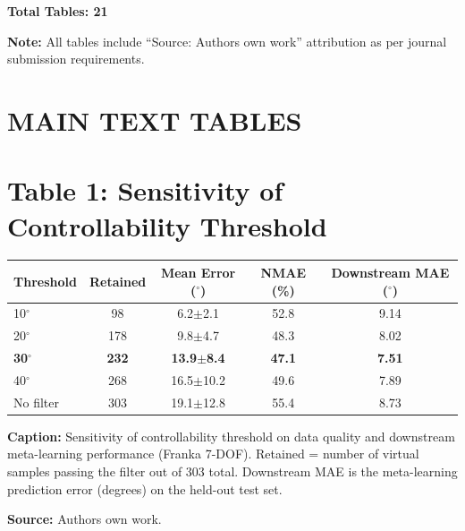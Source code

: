 \documentclass[11pt,a4paper]{article}
\begin{document}
\textbf{Total Tables: 21}

\textbf{Note:} All tables include ``Source: Authors own work'' attribution as per journal submission requirements.


\section*{MAIN TEXT TABLES}


\section*{Table 1: Sensitivity of Controllability Threshold}

\begin{tabular}{lcccc}
\hline
Threshold & Retained & Mean Error ($^\circ$) & NMAE (\%) & Downstream MAE ($^\circ$) \\
\hline
10$^\circ$ & 98 & 6.2$\pm$2.1 & 52.8 & 9.14 \\
20$^\circ$ & 178 & 9.8$\pm$4.7 & 48.3 & 8.02 \\
\textbf{30$^\circ$} & \textbf{232} & \textbf{13.9$\pm$8.4} & \textbf{47.1} & \textbf{7.51} \\
40$^\circ$ & 268 & 16.5$\pm$10.2 & 49.6 & 7.89 \\
No filter & 303 & 19.1$\pm$12.8 & 55.4 & 8.73 \\
\hline
\end{tabular}

\vspace{0.2cm}
\noindent
\textbf{Caption:} Sensitivity of controllability threshold on data quality and downstream meta-learning performance (Franka 7-DOF). Retained = number of virtual samples passing the filter out of 303 total. Downstream MAE is the meta-learning prediction error (degrees) on the held-out test set.

\vspace{0.2cm}
\noindent
\textbf{Source:} Authors own work.

\end{document}
